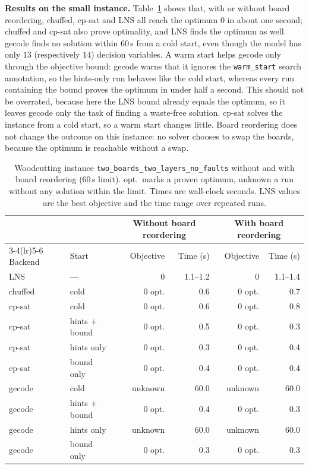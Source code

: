 \documentclass[11pt,a4paper]{article}
\begin{document}
\textbf{Results on the small instance.}
Table~\ref{tab:woodcutting-small} shows that, with or without board
reordering, chuffed, cp-sat and LNS all reach the optimum $0$ in about one
second; chuffed and cp-sat also prove optimality, and LNS finds the optimum
as well.
gecode finds no solution within $60$\,s from a cold start, even though the
model has only $13$ (respectively $14$) decision variables.
A warm start helps gecode only through the objective bound: gecode warns that
it ignores the \texttt{warm\_start} search annotation, so the hints-only run
behaves like the cold start, whereas every run containing the bound proves the
optimum in under half a second.
This should not be overrated, because here the LNS bound already
equals the optimum, so it leaves gecode only the task of finding a waste-free
solution.
cp-sat solves the instance from a cold start, so a warm start changes little.
Board reordering does not change the outcome on this instance: no solver
chooses to swap the boards, because the optimum is reachable without a swap.

\begin{table}[t]
\centering
\footnotesize
\caption{Woodcutting instance \texttt{two\_boards\_two\_layers\_no\_faults}
without and with board reordering ($60$\,s limit). opt.\ marks a proven
optimum, unknown a run without any solution within the limit. Times are
wall-clock seconds. LNS values are the best objective and the time range over
repeated runs.}
\label{tab:woodcutting-small}
\begin{tabular}{@{}llrrrr@{}}
\toprule
& & \multicolumn{2}{c}{Without board reordering} & \multicolumn{2}{c}{With board reordering} \\
\cmidrule(lr){3-4}\cmidrule(lr){5-6}
Backend & Start & Objective & Time (s) & Objective & Time (s) \\
\midrule
LNS     & ---           & 0 & 1.1--1.2 & 0 & 1.1--1.4 \\
chuffed & cold          & 0 opt.        & 0.6      & 0 opt.        & 0.7 \\
cp-sat  & cold          & 0 opt.        & 0.6      & 0 opt.        & 0.8 \\
cp-sat  & hints + bound & 0 opt.        & 0.5      & 0 opt.        & 0.3 \\
cp-sat  & hints only    & 0 opt.        & 0.3      & 0 opt.        & 0.4 \\
cp-sat  & bound only    & 0 opt.        & 0.4      & 0 opt.        & 0.4 \\
gecode  & cold          & unknown       & 60.0     & unknown       & 60.0 \\
gecode  & hints + bound & 0 opt.        & 0.4      & 0 opt.        & 0.3 \\
gecode  & hints only    & unknown       & 60.0     & unknown       & 60.0 \\
gecode  & bound only    & 0 opt.        & 0.3      & 0 opt.        & 0.3 \\
\bottomrule
\end{tabular}
\end{table}
\end{document}
